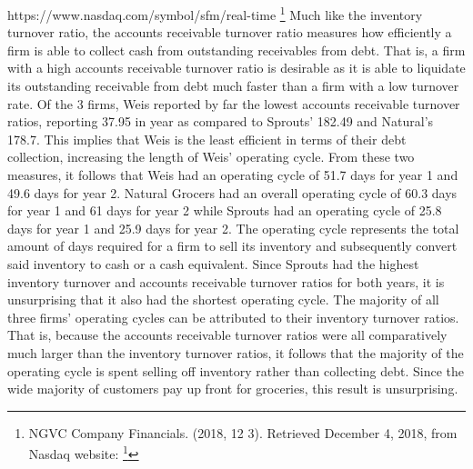 \documentclass[12pt]{article}
\begin{document}
\begin{doublespacing}
{     https://www.nasdaq.com/symbol/sfm/real-time }\footnote{NGVC Company Financials. (2018, 12 3). Retrieved December 4, 2018, from Nasdaq website: 
     \footnote{SFM Company Financials. (2018, 12 3). Retrieved December 4, 2018, from Nasdaq 
     website: https://www.nasdaq.com/symbol/sfm/real-time } } Much like the inventory turnover ratio, the accounts receivable turnover ratio measures how efficiently a firm is able to collect cash from outstanding receivables from debt. That is, a firm with a high accounts receivable turnover ratio is desirable as it is able to liquidate its outstanding receivable from debt much faster than a firm with a low turnover rate. Of the 3 firms, Weis reported by far the lowest accounts receivable turnover ratios, reporting 37.95 in year as compared to Sprouts’ 182.49 and Natural’s 178.7. This implies that Weis is the least efficient in terms of their debt collection, increasing the length of Weis’ operating cycle. From these two measures, it follows that Weis had an operating cycle of 51.7 days for year 1 and 49.6 days for year 2. Natural Grocers had an overall operating cycle of 60.3 days for year 1 and 61 days for year 2 while Sprouts had an operating cycle of 25.8 days for year 1 and 25.9 days for year 2. The operating cycle represents the total amount of days required for a firm to sell its inventory and subsequently convert said inventory to cash or a cash equivalent. Since Sprouts had the highest inventory turnover and accounts receivable turnover ratios for both years, it is unsurprising that it also had the shortest operating cycle. The majority of all three firms’ operating cycles can be attributed to their inventory turnover ratios. That is, because the accounts receivable turnover ratios were all comparatively much larger than the inventory turnover ratios, it follows that the majority of the operating cycle is spent selling off inventory rather than collecting debt. Since the wide majority of customers pay up front for groceries, this result is unsurprising. 


\end{doublespacing}
\end{document}
